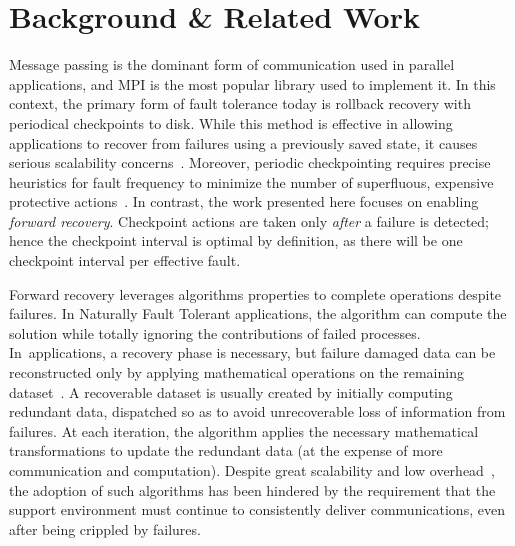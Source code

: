 \section{Background \& Related Work}
\label{sect:background}




Message passing is the dominant form of communication used in parallel
applications, and MPI is the most popular library used to implement it.
In this context, the primary form of fault tolerance today is rollback recovery with periodical checkpoints to disk. While this method is effective in allowing
applications to recover from failures using a previously saved state, it causes
serious scalability concerns~\cite{ExaScaleResilience09}. Moreover, periodic
checkpointing requires precise heuristics for fault frequency to minimize the
number of superfluous, expensive protective
actions~\cite{Young:1974,Gelenbe:1979,Plank01,Daly:2006,PreventiveCheckpointing11}.
In contrast, the work presented here focuses on enabling {\it forward
  recovery}. Checkpoint actions are taken only {\it after} a failure is
detected; hence the checkpoint interval is optimal by definition, as there will
be one checkpoint interval per effective fault.

Forward recovery leverages algorithms properties to complete operations
despite failures. In Naturally Fault Tolerant applications, the algorithm
can compute the solution while totally ignoring the contributions of failed processes. In~\abft applications, a recovery phase is necessary, but failure damaged data can be reconstructed only by applying mathematical operations on the remaining dataset~\cite{huang1984algorithm}. A recoverable dataset is usually created by initially computing redundant data, dispatched so as to avoid unrecoverable loss of information from failures. At each iteration, the algorithm applies the necessary mathematical transformations to update the redundant data (at the expense of more communication and computation). Despite great scalability and low overhead~\cite{luk1988analysis,pengduppopp12}, the
adoption of such algorithms has been hindered by the requirement that
the support environment must continue to consistently deliver
communications, even after being crippled by failures.

